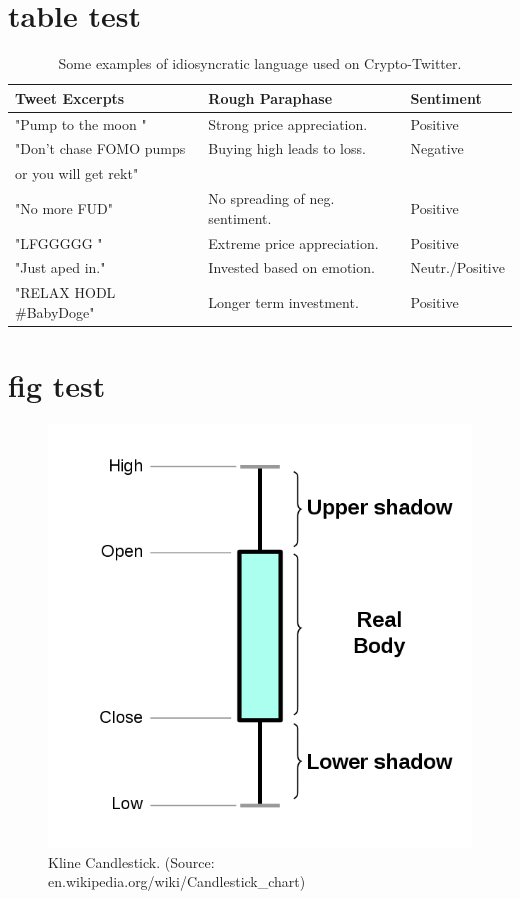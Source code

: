 \documentclass[11pt]{article}
\begin{document}
\section{table test}

\begin{table}[H]
\renewcommand{\arraystretch}{1.2}
\centering
\caption{\label{table:example-tweets} Some examples of idiosyncratic language used on Crypto-Twitter.}
\begin{tabular}{lll}
\textbf{Tweet Excerpts} & \textbf{Rough Paraphase} & \textbf{Sentiment}  \\ \midrule
"Pump to the moon " & Strong price appreciation. & Positive   \\
"Don't chase FOMO pumps  & Buying high leads to loss. & Negative\\
or you will get rekt" & & \\
"No more FUD" & No spreading of neg. sentiment. & Positive\\
"LFGGGGG " & Extreme price appreciation. & Positive \\
"Just aped in." & Invested based on emotion. & Neutr./Positive \\
"RELAX HODL \#BabyDoge" & Longer term investment. & Positive \\
\bottomrule
\end{tabular}
\end{table}

\section{fig test}

\begin{figure}[H]
\centering
\includegraphics[scale=0.2]{figures/candlestickwiki.png}
\caption {Kline Candlestick. (Source: en.wikipedia.org/wiki/Candlestick\_chart)}
\label{fig:candlestick}
\end{figure}
\end{document}
